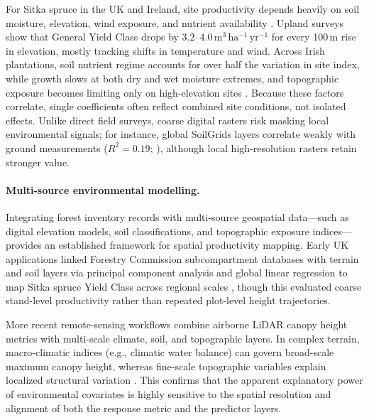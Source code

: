For Sitka spruce in the UK and Ireland, site productivity depends heavily on soil moisture, elevation, wind exposure, and nutrient availability \citep{worrell1990Productivity1_C1_SS,farrelly2011Sitka_C1_SS}. Upland surveys show that General Yield Class drops by $3.2$--$4.0\,\mathrm{m^3\,ha^{-1}\,yr^{-1}}$ for every 100\,m rise in elevation, mostly tracking shifts in temperature and wind. Across Irish plantations, soil nutrient regime accounts for over half the variation in site index, while growth slows at both dry and wet moisture extremes, and topographic exposure becomes limiting only on high-elevation sites \citep{farrelly2011Sitka_C1_SS}. Because these factors correlate, single coefficients often reflect combined site conditions, not isolated effects. Unlike direct field surveys, coarse digital rasters risk masking local environmental signals; for instance, global SoilGrids layers correlate weakly with ground measurements ($R^2 = 0.19$; \citealt{miller2024Assessing_C2_CR}), although local high-resolution rasters retain stronger value.

\paragraph*{Multi-source environmental modelling.}
Integrating forest inventory records with multi-source geospatial data—such as digital elevation models, soil classifications, and topographic exposure indices—provides an established framework for spatial productivity mapping. Early UK applications linked Forestry Commission subcompartment databases with terrain and soil layers via principal component analysis and global linear regression to map Sitka spruce Yield Class across regional scales \citep{bateman1998Using_C1_SS}, though this evaluated coarse stand-level productivity rather than repeated plot-level height trajectories.

More recent remote-sensing workflows combine airborne LiDAR canopy height metrics with multi-scale climate, soil, and topographic layers. In complex terrain, macro-climatic indices (e.g., climatic water balance) can govern broad-scale maximum canopy height, whereas fine-scale topographic variables explain localized structural variation \citep{fricker2019More_C3_LID}. This confirms that the apparent explanatory power of environmental covariates is highly sensitive to the spatial resolution and alignment of both the response metric and the predictor layers.



